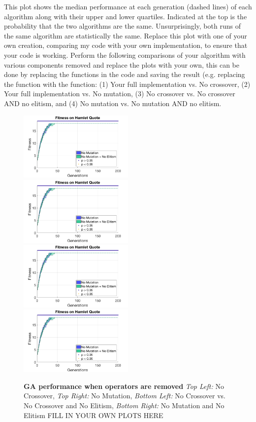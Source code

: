 \documentclass{article}
\begin{document}
	This plot shows the median performance at each generation (dashed lines) of each algorithm along with their upper and lower quartiles. Indicated at the top is the probability that the two algorithms are the same. Unsurprisingly, both runs of the same algorithm are statistically the same. Replace this plot with one of your own creation, comparing my code with your own implementation, to ensure that your code is working.
\newpage
	Perform the following comparisons of your algorithm with various components removed and replace the plots with your own, this can be done by replacing the functions in the code and saving the result (e.g. replacing the  function with the  function: (1) Your full implementation vs. No crossover, (2) Your full implementation vs. No mutation, (3) No crossover vs. No crossover AND no elitism, and (4) No mutation  vs. No mutation AND no elitism.

		\begin{figure}[h!]
		\includegraphics[width=0.5\textwidth]{img/2_vsNoCross.png}
		\includegraphics[width=0.5\textwidth]{img/3_vsNoMut.png}
		\includegraphics[width=0.5\textwidth]{img/4_vsNoCrossNoElite.png}
		\includegraphics[width=0.5\textwidth]{img/5_vsNoMutNoElite.png}
		\caption
		{
		\textbf{GA performance when operators are removed}\newline
		\textit{Top Left:} No Crossover,
		\textit{Top Right:} No Mutation, 
		\textit{Bottom Left:} No Crossover vs. No Crossover and No Elitism, 
		\textit{Bottom Right:} No Mutation and No Elitism
		\color{red}FILL IN YOUR OWN PLOTS HERE
		}
		\end{figure}
\newpage
\end{document}

